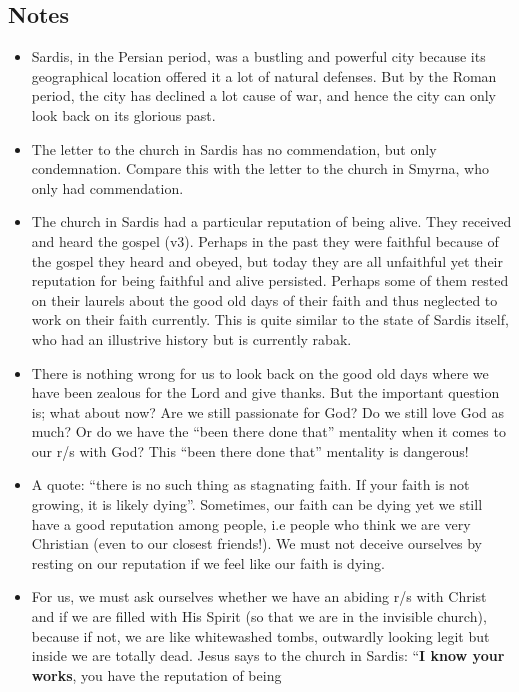 \subsection*{Notes}
\begin{itemize}
  \item{Sardis, in the Persian period, was a bustling and powerful city
  because its geographical location offered it a lot of natural defenses.
  But by the Roman period, the city has declined a lot cause of war, and
  hence the city can only look back on its glorious past.}
  \item{The letter to the church in Sardis has no commendation, but only
  condemnation.  Compare this with the letter to the church in Smyrna, who
  only had commendation.}
  \item{The church in Sardis had a particular reputation of being alive.
  They received and heard the gospel (v3).  Perhaps in the past they were
  faithful because of the gospel they heard and obeyed, but today they are
  all unfaithful yet their reputation for being faithful and alive persisted.
  Perhaps some of them rested on their laurels about the good old days of
  their faith and thus neglected to work on their faith currently.  This is
  quite similar to the state of Sardis itself, who had an illustrive history
  but is currently rabak.}
  \item{There is nothing wrong for us to look back on the good old days where
  we have been zealous for the Lord and give thanks.  But the important
  question is; what about now?  Are we still passionate for God?  Do we still
  love God as much?  Or do we have the ``been there done that'' mentality
  when it comes to our r/s with God?  This ``been there done that'' mentality
  is dangerous!}
  \item{A quote: ``there is no such thing as stagnating faith.  If your faith
  is not growing, it is likely dying''.  Sometimes, our faith can be dying
  yet we still have a good reputation among people, i.e people who think we
  are very Christian (even to our closest friends!).  We must not deceive
  ourselves by resting on our reputation if we feel like our faith is dying.}
  \item{For us, we must ask ourselves whether we have an abiding r/s with
  Christ and if we are filled with His Spirit (so that we are in the
  invisible church), because if not, we are like whitewashed tombs, outwardly
  looking legit but inside we are totally dead.  Jesus says to the church in
  Sardis: ``\textbf{I know your works}, you have the reputation of being
}
\end{itemize}
